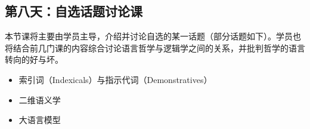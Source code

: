 \documentclass{article}
\begin{document}
\subsection*{第八天：自选话题讨论课}

本节课将主要由学员主导，介绍并讨论自选的某一话题（部分话题如下）。学员也将结合前几门课的内容综合讨论语言哲学与逻辑学之间的关系，并批判哲学的语言转向的好与坏。
\begin{itemize}
  \item 索引词（Indexicals）与指示代词（Demonstratives）
  \item 二维语义学
  \item 大语言模型
\end{itemize}


\end{document}
